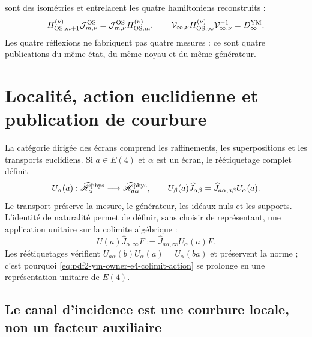sont des isométries et entrelacent les quatre hamiltoniens reconstruits :
\begin{equation}\label{eq:pdf2-ym-owner-common-os-hamiltonian}
 H_{{\rm OS},m+1}^{(\nu)}\mathcal J_{m,\nu}^{\rm OS}
 =\mathcal J_{m,\nu}^{\rm OS}H_{{\rm OS},m}^{(\nu)},
 \qquad
 \mathcal V_{\infty,\nu}H_{{\rm OS},\infty}^{(\nu)}
 \mathcal V_{\infty,\nu}^{-1}=D_\infty^{\rm YM}.
\end{equation}
Les quatre réflexions ne fabriquent pas quatre mesures : ce sont quatre publications du même
état, du même noyau et du même générateur.

\section{Localité, action euclidienne et publication de courbure}

La catégorie dirigée des écrans comprend les raffinements, les superpositions et les transports
euclidiens. Si $a\in E(4)$ et $\alpha$ est un écran, le réétiquetage complet définit
\begin{equation}\label{eq:pdf2-ym-owner-e4-finite-transport}
 U_\alpha(a):\widehat{\mathscr H}_\alpha^{\rm phys}
 \longrightarrow\widehat{\mathscr H}_{a\alpha}^{\rm phys},
 \qquad
 U_\beta(a)\widehat J_{\alpha\beta}
 =\widehat J_{a\alpha,a\beta}U_\alpha(a).
\end{equation}
Le transport préserve la mesure, le générateur, les idéaux nuls et les supports. L'identité de naturalité permet de définir, sans choisir de représentant, une application unitaire sur la colimite algébrique :
\begin{equation}\label{eq:pdf2-ym-owner-e4-colimit-action}
 U(a)\widehat J_{\alpha,\infty}F
 :=\widehat J_{a\alpha,\infty}U_\alpha(a)F.
\end{equation}
Les réétiquetages vérifient $U_{a\alpha}(b)U_\alpha(a)=U_\alpha(ba)$ et préservent
la norme ; c’est pourquoi \eqref{eq:pdf2-ym-owner-e4-colimit-action} se prolonge en une
représentation unitaire de $E(4)$.

\subsection{Le canal d'incidence est une courbure locale, non un facteur auxiliaire}

